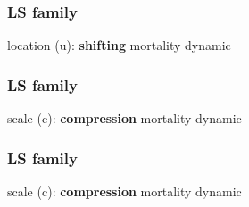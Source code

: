 \documentclass[12pt, xcolor=table]{beamer}  %
\begin{document}
\begin{frame}[noframenumbering]\frametitle{LS family}
	\begin{center}
		\vspace{0.15cm}
		\normalsize {\color{red}location (u)}: \textbf{shifting} mortality dynamic \\
	\end{center}
	
\end{frame}

\begin{frame}\frametitle{LS family}
	\begin{center}
		\vspace{0.15cm}
		\normalsize {\color{blue}scale (c)}: \textbf{compression} mortality dynamic \\
	\end{center}
	
\end{frame}

\begin{frame}[noframenumbering]\frametitle{LS family}
	\begin{center}
		\vspace{0.15cm}
		\normalsize {\color{blue}scale (c)}: \textbf{compression} mortality dynamic \\
	\end{center}
	
\end{frame}

%
\end{document}
